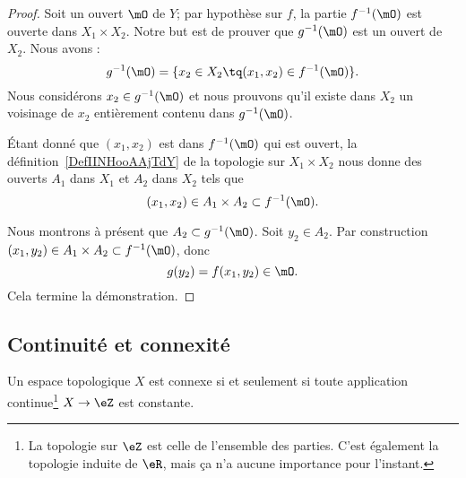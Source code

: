 \begin{proof}
	Soit un ouvert \( \mO\) de \( Y\); par hypothèse sur \( f\), la partie \( f^{-1}(\mO)\) est ouverte dans \( X_1\times X_2\). Notre but est de prouver que \( g^{-1}(\mO)\) est un ouvert de \( X_2\). Nous avons :
	\begin{equation}
		g^{-1}(\mO)=\{ x_2\in X_2\tq (x_1,x_2)\in f^{-1}(\mO) \}.
	\end{equation}
	Nous considérons \( x_2\in g^{-1}(\mO)\) et nous prouvons qu'il existe dans \( X_2\) un voisinage de \( x_2\) entièrement contenu dans \( g^{-1}(\mO)\).

	Étant donné que \( (x_1,x_2)\) est dans \( f^{-1}(\mO)\) qui est ouvert, la définition~\ref{DefIINHooAAjTdY} de la topologie sur \( X_1\times X_2\) nous donne des ouverts \( A_1\) dans \( X_1\) et \( A_2\) dans \( X_2\) tels que
	\begin{equation}
		(x_1,x_2)\in A_1\times A_2\subset f^{-1}(\mO).
	\end{equation}

	Nous montrons à présent que \( A_2\subset g^{-1}(\mO)\). Soit \( y_2\in A_2\). Par construction \( (x_1,y_2)\in A_1\times A_2\subset f^{-1}(\mO)\), donc
	\begin{equation}
		g(y_2)=f(x_1,y_2)\in \mO.
	\end{equation}
	Cela termine la démonstration.
\end{proof}

\subsection{Continuité et connexité}

\begin{proposition} \label{PropConnexiteViaFonction}
	Un espace topologique \( X \) est connexe si et seulement si toute application continue\footnote{La topologie sur \( \eZ\) est celle de l'ensemble des parties. C'est également la topologie induite de \( \eR\), mais ça n'a aucune importance pour l'instant.} \( X\to \eZ\) est constante.
\end{proposition}

